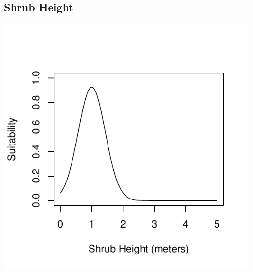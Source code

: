 \documentclass[12pt,letterpaper]{article}\usepackage{graphicx, color}
\makeatletter
\def\maxwidth{ %
  \ifdim\Gin@nat@width>\linewidth
    \linewidth
  \else
    \Gin@nat@width
  \fi
}
\newenvironment{knitrout}{}{} %
\makeatother
\begin{document}
\subsection{Shrub Height}
\begin{knitrout}
\color{fgcolor}\includegraphics[width=\maxwidth]{figure/Ellis_Shrub_Height} 
\end{knitrout}
\end{document}
